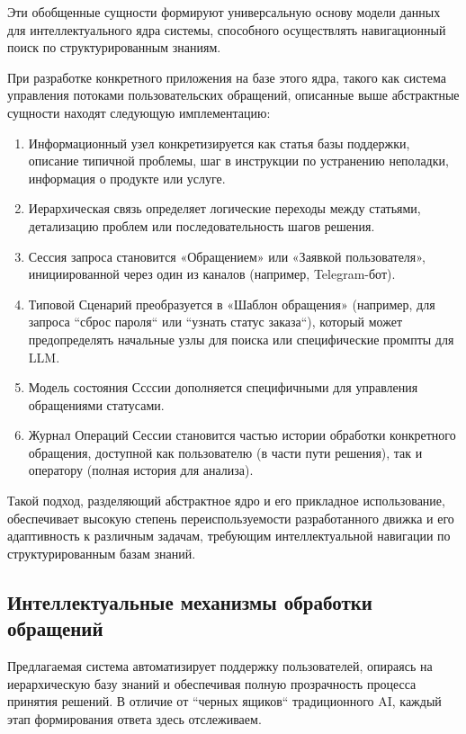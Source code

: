 Эти обобщенные сущности формируют универсальную основу модели данных для интеллектуального ядра системы, способного осуществлять навигационный поиск по структурированным знаниям.

При разработке конкретного приложения на базе этого ядра, такого как система управления потоками пользовательских обращений, описанные выше абстрактные сущности находят следующую имплементацию:

\begin{enumerate}[label=\arabic*]
    \item Информационный узел конкретизируется как статья базы поддержки, описание типичной проблемы, шаг в инструкции по устранению неполадки, информация о продукте или услуге.

    \item Иерархическая связь определяет логические переходы между статьями, детализацию проблем или последовательность шагов решения.
    
    \item Сессия запроса становится «Обращением» или «Заявкой пользователя», инициированной через один из каналов (например, Telegram-бот).

    \item Типовой Сценарий преобразуется в «Шаблон обращения» (например, для запроса ``сброс пароля`` или ``узнать статус заказа``), который может предопределять начальные узлы для поиска или специфические промпты для LLM.

    \item Модель состояния Ссссии дополняется специфичными для управления обращениями статусами.

    \item Журнал Операций Сессии становится частью истории обработки конкретного обращения, доступной как пользователю (в части пути решения), так и оператору (полная история для анализа).
\end{enumerate}

Такой подход, разделяющий абстрактное ядро и его прикладное использование, обеспечивает высокую степень переиспользуемости разработанного движка и его адаптивность к различным задачам, требующим интеллектуальной навигации по структурированным базам знаний.

\subsection{Интеллектуальные механизмы обработки обращений}

Предлагаемая система автоматизирует поддержку пользователей, опираясь на иерархическую базу знаний и обеспечивая полную прозрачность процесса принятия решений. В отличие от ``черных ящиков`` традиционного AI, каждый этап формирования ответа здесь отслеживаем.

